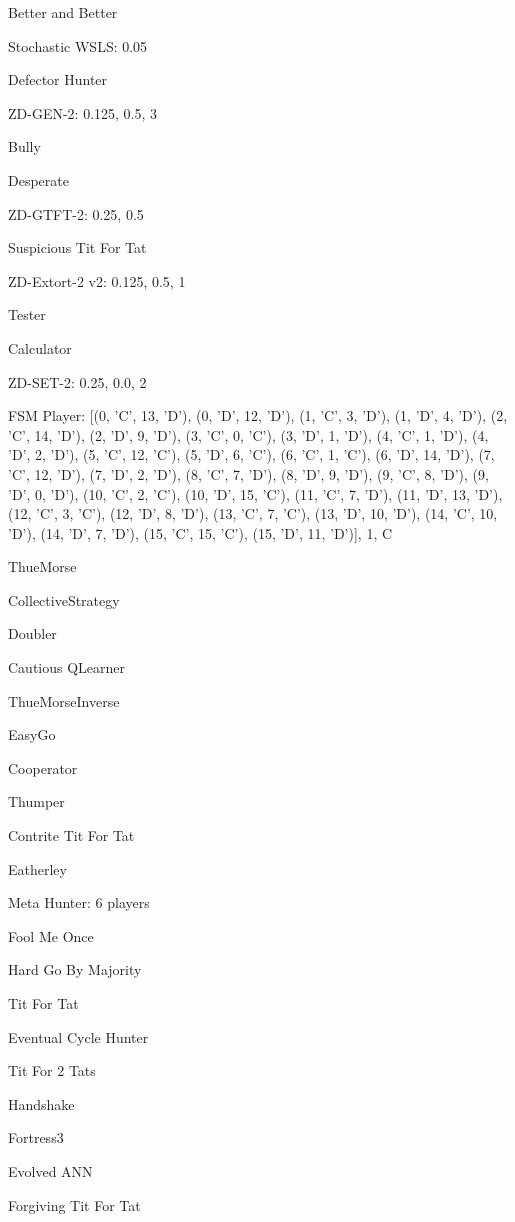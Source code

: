 \item Better and Better
\item Stochastic WSLS: 0.05
\item Defector Hunter
\item ZD-GEN-2: 0.125, 0.5, 3
\item Bully
\item Desperate
\item ZD-GTFT-2: 0.25, 0.5
\item Suspicious Tit For Tat
\item ZD-Extort-2 v2: 0.125, 0.5, 1
\item Tester
\item Calculator
\item ZD-SET-2: 0.25, 0.0, 2
\item FSM Player: [(0, 'C', 13, 'D'), (0, 'D', 12, 'D'), (1, 'C', 3, 'D'), (1, 'D', 4, 'D'), (2, 'C', 14, 'D'), (2, 'D', 9, 'D'), (3, 'C', 0, 'C'), (3, 'D', 1, 'D'), (4, 'C', 1, 'D'), (4, 'D', 2, 'D'), (5, 'C', 12, 'C'), (5, 'D', 6, 'C'), (6, 'C', 1, 'C'), (6, 'D', 14, 'D'), (7, 'C', 12, 'D'), (7, 'D', 2, 'D'), (8, 'C', 7, 'D'), (8, 'D', 9, 'D'), (9, 'C', 8, 'D'), (9, 'D', 0, 'D'), (10, 'C', 2, 'C'), (10, 'D', 15, 'C'), (11, 'C', 7, 'D'), (11, 'D', 13, 'D'), (12, 'C', 3, 'C'), (12, 'D', 8, 'D'), (13, 'C', 7, 'C'), (13, 'D', 10, 'D'), (14, 'C', 10, 'D'), (14, 'D', 7, 'D'), (15, 'C', 15, 'C'), (15, 'D', 11, 'D')], 1, C
\item ThueMorse
\item CollectiveStrategy
\item Doubler
\item Cautious QLearner
\item ThueMorseInverse
\item EasyGo
\item Cooperator
\item Thumper
\item Contrite Tit For Tat
\item Eatherley
\item Meta Hunter: 6 players
\item Fool Me Once
\item Hard Go By Majority
\item Tit For Tat
\item Eventual Cycle Hunter
\item Tit For 2 Tats
\item Handshake
\item Fortress3
\item Evolved ANN
\item Forgiving Tit For Tat
